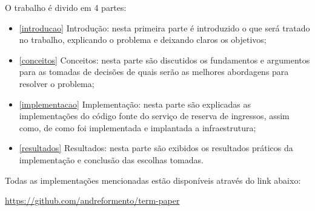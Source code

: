 O trabalho é divido em 4 partes:

\begin{itemize}
    \item \autoref{introducao} Introdução: nesta primeira parte é introduzido o que
          será tratado no trabalho, explicando o problema e deixando claros os objetivos;

    \item \autoref{conceitos} Conceitos: nesta parte são discutidos os fundamentos e
          argumentos para as tomadas de decisões de quais serão as melhores
          abordagens para resolver o problema;

    \item \autoref{implementacao} Implementação: nesta parte são explicadas as
          implementações do código fonte do serviço de reserva de ingressos, assim
          como, de como foi implementada e implantada a infraestrutura;

    \item \autoref{resultados} Resultados: nesta parte são exibidos os resultados
          práticos da implementação e conclusão das escolhas tomadas.

\end{itemize}

Todas as implementações mencionadas estão disponíveis através do link abaixo:

\url{https://github.com/andreformento/term-paper}
